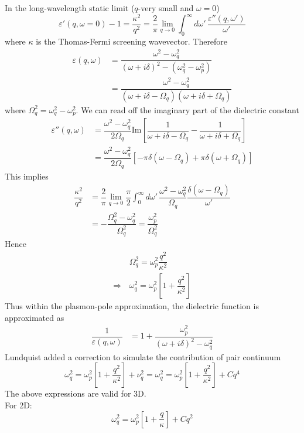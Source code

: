 \documentclass[aps,prb,onecolumn,notitlepage,showpacs,floatfix,superscriptaddress]{revtex4-1}
\begin{document}
In the long-wavelength static limit ($q$-very small and $\omega=0$)
\begin{equation}
\varepsilon'(q,\omega=0)-1=\dfrac{\kappa^2}{q^2} =\dfrac{2}{\pi} \lim_{q \rightarrow 0} \int_0^\infty d\omega' \, \dfrac{ \varepsilon''(q,\omega')}{\omega'}
\end{equation}
where $\kappa$ is the Thomas-Fermi screening wavevector. Therefore
\begin{equation}
\begin{split}
\varepsilon(q,\omega) &= \dfrac{\omega^2-\omega_q^2}{(\omega+i\delta)^2-(\omega_q^2 - \omega_p^2)} \\
&=\dfrac{\omega^2-\omega_q^2}{(\omega+i\delta-\Omega_q)(\omega+i\delta+\Omega_q)}
\end{split}
\end{equation}
where $\Omega_q^2=\omega_q^2 - \omega_p^2$. We can read off the imaginary part of the dielectric constant
\begin{equation}
\begin{split}
\varepsilon''(q,\omega) &= \dfrac{\omega^2-\omega_q^2}{2\Omega_q} \textrm{Im} \left[ \dfrac{1}{\omega+i\delta-\Omega_q}- \dfrac{1}{\omega+i\delta+\Omega_q}\right] \\
&=\dfrac{\omega^2-\omega_q^2}{2\Omega_q} \left[ -\pi \delta(\omega-\Omega_q)+\pi \delta(\omega+\Omega_q)\right]
\end{split}
\end{equation}
This implies
\begin{equation}
\begin{split}
\dfrac{\kappa^2}{q^2}& =\dfrac{2}{\pi} \lim_{q \rightarrow 0}\dfrac{\pi}{2} \int_0^\infty d\omega' \, \dfrac{\omega^2-\omega_q^2}{\Omega_q} \dfrac{\delta(\omega-\Omega_q)}{\omega'} \\
&=-\dfrac{\Omega_q^2-\omega_q^2}{\Omega_q^2} = \dfrac{\omega_p^2}{\Omega_q^2}
\end{split}
\end{equation}
Hence
\begin{equation}
\begin{split}
&\Omega_q^2 = \omega_p^2 \dfrac{q^2}{\kappa^2} \\
\Rightarrow \, & \omega_q^2 = \omega_p^2 \left[1+\dfrac{q^2}{\kappa^2} \right]
\end{split}
\end{equation}
Thus within the plasmon-pole approximation, the dielectric function is approximated as 
\begin{equation}
\begin{split}
\dfrac{1}{\varepsilon(q,\omega)}&=1+ \dfrac{\omega_p^2}{(\omega + i \delta)^2-\omega_q^2}
\end{split} 
\end{equation}
Lundquist added a correction to simulate the contribution of pair continuum
\begin{equation}
\omega_q^2 = \omega_p^2 \left[1+\dfrac{q^2}{\kappa^2} \right] + \nu_q^2 = \omega_q^2 = \omega_p^2 \left[1+\dfrac{q^2}{\kappa^2} \right] + C q^4
\end{equation}
The above expressions are valid for 3D. \\

For 2D:
\begin{equation}
 \omega_q^2 = \omega_p^2 \left[1+\dfrac{q}{\kappa} \right] + C q^2
\end{equation}
\end{document}
